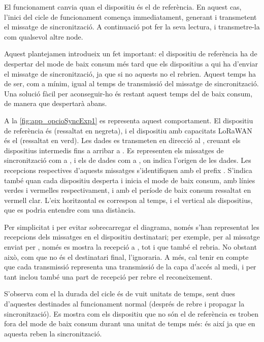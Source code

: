 \documentclass{tfgitic}[2024/07/01]
\begin{document}
{El funcionament canvia quan el dispositiu és el de referència. En aquest cas, l'inici del cicle de funcionament comença immediatament, generant i transmetent el missatge de sincronització. A continuació pot fer la seva lectura, i transmetre-la com qualsevol altre node.

Aquest plantejamen introdueix un fet important: el dispositiu de referència ha de despertar del mode de baix consum més tard que els dispositius a qui ha d'enviar el missatge de sincronització, ja que si no aquests no el rebrien. Aquest temps ha de ser, com a mínim, igual al temps de transmissió del missatge de sincronització. Una solució fàcil per aconseguir-ho és restant aquest temps del de baix consum, de manera que despertarà abans. 

A la \autoref{fig:app_opcioSyncExp1} es representa aquest comportament. El dispositiu de referència és  (ressaltat en negreta), i el dispositiu amb capacitats LoRaWAN és el  (ressaltat en verd). Les dades es transmeten en direcció al , creuant els dispositius intermedis fins a arribar a . Es representen els missatges de sincronització com a , i els de dades com a , on  indica l'origen de les dades. Les recepcions respectives d'aquests missatges s'identifiquen amb el prefix . S'indica també quan cada dispositiu desperta i inicia el mode de baix consum, amb línies verdes i vermelles respectivament, i amb el període de baix consum ressaltat en vermell clar. L'eix horitzontal es correspon al temps, i el vertical als dispositius, que es podria entendre com una distància.

Per simplicitat i per evitar sobrecarregar el diagrama, només s'han representat les recepcions dels missatges en el dispositiu destinatari; per exemple, per al missatge  enviat per , només es mostra la recepció a , tot i que  també el rebria. No obstant això, com que no és el destinatari final, l'ignoraria. A més, cal tenir en compte que cada transmissió representa una transmissió de la capa d'accés al medi, i per tant inclou també una part de recepció per rebre el reconeixement.

S'observa com el la durada del cicle és de vuit unitats de temps, sent dues d'aquestes destinades al funcionament normal (després de rebre i propagar la sincronització). Es mostra com els dispositiu que no són el de referència es troben fora del mode de baix consum durant una unitat de temps més: és així ja que en aquesta reben la sincronització.

}
\end{document}
